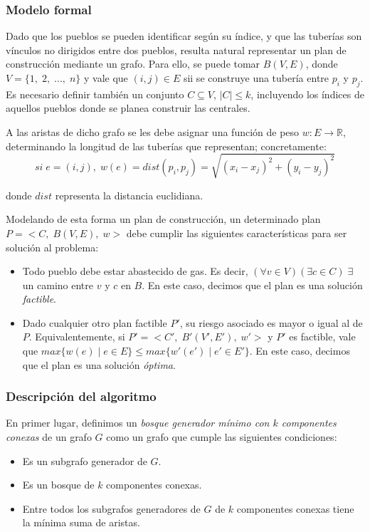 \subsubsection{Modelo formal}

Dado que los pueblos se pueden identificar según su índice, y que las tuberías son vínculos no dirigidos entre dos pueblos, resulta natural representar un plan de construcción mediante un grafo. Para ello, se puede tomar $B(V, E)$, donde $V = \{1,\;2,\;...,\;n\}$ y vale que $(i,j) \in E$ sii se construye una tubería entre $p_i$ y $p_j$. Es necesario definir también un conjunto $C \subseteq V$, $|C| \leq k$, incluyendo los índices de aquellos pueblos donde se planea construir las centrales.

A las aristas de dicho grafo se les debe asignar una función de peso $w:E\rightarrow\mathbb{R}$, determinando la longitud de las tuberías que representan; concretamente:
$$si\;e = (i,j),\;w(e) = dist(p_i,p_j) = \sqrt{(x_i - x_j)^2 + (y_i - y_j)^2}$$

donde $dist$ representa la distancia euclidiana.

Modelando de esta forma un plan de construcción, un determinado plan $P = <C,\;B(V, E),\;w>$ debe cumplir las siguientes características para ser solución al problema:

\begin{itemize}
  \item Todo pueblo debe estar abastecido de gas. Es decir, $(\forall v \in V)(\exists c \in C)\;\exists$ un camino entre $v$ y $c$ en $B$. En este caso, decimos que el plan es una solución \emph{factible}.
  
  \item Dado cualquier otro plan factible $P'$, su riesgo asociado es mayor o igual al de $P$. Equivalentemente, si $P' = <C',\;B'(V', E'),\;w'>$ y $P'$ es factible, vale que $max\{w(e)\;|\;e\in E\} \leq max\{w'(e')\;|\;e'\in E'\}$. En este caso, decimos que el plan es una solución \emph{óptima}.
\end{itemize}

\subsubsection{Descripción del algoritmo}

En primer lugar, definimos un \emph{bosque generador mínimo con $k$ componentes conexas} de un grafo $G$ como un grafo que cumple las siguientes condiciones:

\begin{itemize}
  \item Es un subgrafo generador de $G$.

  \item Es un bosque de $k$ componentes conexas.

  \item Entre todos los subgrafos generadores de $G$ de $k$ componentes conexas tiene la mínima suma de aristas.
\end{itemize}

